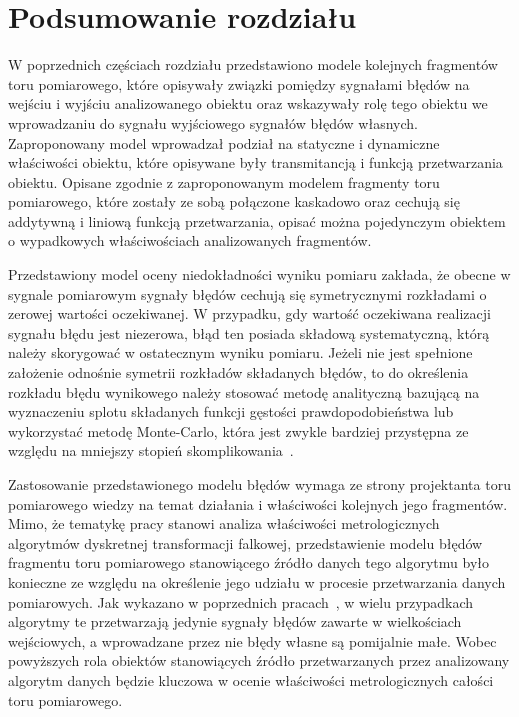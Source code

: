 \section{Podsumowanie rozdziału}

W poprzednich częściach rozdziału przedstawiono modele kolejnych fragmentów toru pomiarowego, które opisywały związki pomiędzy sygnałami błędów na wejściu i wyjściu analizowanego obiektu oraz wskazywały rolę tego obiektu we wprowadzaniu do sygnału wyjściowego sygnałów błędów własnych. Zaproponowany model wprowadzał podział na statyczne i dynamiczne właściwości obiektu, które opisywane były transmitancją i funkcją przetwarzania obiektu. Opisane zgodnie z zaproponowanym modelem fragmenty toru pomiarowego, które zostały ze sobą połączone kaskadowo oraz cechują się addytywną i liniową funkcją przetwarzania, opisać można pojedynczym obiektem o wypadkowych właściwościach analizowanych fragmentów.

Przedstawiony model oceny niedokładności wyniku pomiaru zakłada, że obecne w sygnale pomiarowym sygnały błędów cechują się symetrycznymi rozkładami o zerowej wartości oczekiwanej. W przypadku, gdy wartość oczekiwana realizacji sygnału błędu jest niezerowa, błąd ten posiada składową systematyczną, którą należy skorygować w ostatecznym wyniku pomiaru. Jeżeli nie jest spełnione założenie odnośnie symetrii rozkładów składanych błędów, to do określenia rozkładu błędu wynikowego należy stosować metodę analityczną bazującą na wyznaczeniu splotu składanych funkcji gęstości prawdopodobieństwa lub wykorzystać metodę Monte-Carlo, która jest zwykle bardziej przystępna ze względu na mniejszy stopień skomplikowania~\cite{janssen_montecarlo, roj_annuncertainty}.

Zastosowanie przedstawionego modelu błędów wymaga ze strony projektanta toru pomiarowego wiedzy na temat działania i właściwości kolejnych jego fragmentów. Mimo, że tematykę pracy stanowi analiza właściwości metrologicznych algorytmów dyskretnej transformacji falkowej, przedstawienie modelu błędów fragmentu toru pomiarowego stanowiącego źródło danych tego algorytmu było konieczne ze względu na określenie jego udziału w procesie przetwarzania danych pomiarowych. Jak wykazano w poprzednich pracach~\cite{auth_window, auth_electronics}, w wielu przypadkach algorytmy te przetwarzają jedynie sygnały błędów zawarte w wielkościach wejściowych, a wprowadzane przez nie błędy własne są pomijalnie małe. Wobec powyższych rola obiektów stanowiących źródło przetwarzanych przez analizowany algorytm danych będzie kluczowa w ocenie właściwości metrologicznych całości toru pomiarowego.

